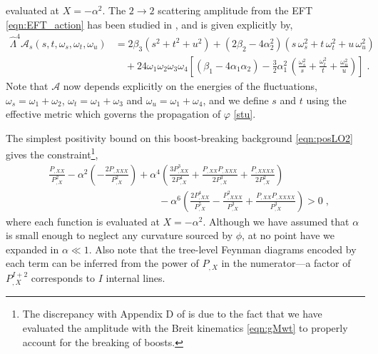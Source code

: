 \documentclass[11pt]{article}
\begin{document}
evaluated at $X=-\alpha^2$. 
The $2 \to 2$ scattering amplitude from the EFT \eqref{eqn:EFT_action} has been studied in \cite{Baumann:2015nta, Grall:2021xxm}, and is given explicitly by, 
\begin{align}
\hat{\Lambda}^4\mathcal{A}_s (s,t, \omega_s, \omega_t, \omega_u) &= 
2 \beta_3(s^2+t^2+u^2)  
+ (2 \beta_2-4 \alpha_2^2) (s\,\omega_s^2 + t\, \omega_t^2 +u\, \omega_u^2) \nonumber \\
&\quad+ 24 \omega_1 \omega_2 \omega_3 \omega_4  \left[   \left( \beta_1- 4 \alpha_1 \alpha_2  \right) 
-  \frac{3}{2} \alpha_1^2  \,   \left(\frac{\omega_s^2}{s}+\frac{\omega_t^2}{t}+\frac{\omega_u^2}{u}\right) \right] \; .   \nonumber 
\end{align}
Note that $\mathcal{A}$ now depends explicitly on the energies of the fluctuations, $\omega_s = \omega_1 + \omega_2$, $\omega_t = \omega_1 + \omega_3$ and $\omega_u = \omega_1 + \omega_4$, and we define $s$ and $t$ using the effective metric which governs the propagation of $\varphi$ \eqref{stu}.

The simplest positivity bound on this boost-breaking background \eqref{eqn:posLO2} gives the constraint\footnote{
The discrepancy with Appendix D of \cite{Ye:2019oxx} is due to the fact that we have evaluated the amplitude with the Breit kinematics \eqref{eqn:gMwt} to properly account for the breaking of boosts. 
},
\begin{align}
&\frac{P_{,XX} }{ P_{,X}^2 } - \alpha^2 \left( - \frac{ 2 P_{,XXX} }{ P_{,X}^2 } \right) + \alpha^4 
\left( 
 \frac{ 3 P_{,XX}^3 }{ 2 P_{,X}^4 } +  \frac{ P_{,XX} P_{,XXX} }{ 2 P_{,X}^3 } +  \frac{ P_{,XXXX} }{ 2 P_{,X}^2 }  \right)  \nonumber  \\
&\qquad\qquad\qquad\qquad\qquad\quad- \alpha^6 \left(
 \frac{2 P_{,XX}^4 }{ P_{,X}^5 } - \frac{ P_{,XXX}^2 }{ P_{,X}^3 } + \frac{  P_{,XX} P_{,XXXX} }{ P_{,X}^3 }  \right) > 0 \; , 
 \label{eqn:pos_PX}
\end{align}
where each function is evaluated at $X = - \alpha^2$. Although we have assumed that $\alpha$ is small enough to neglect any curvature sourced by $\phi$, at no point have we expanded in $\alpha \ll 1$. Also note that the tree-level Feynman diagrams encoded by each term can be inferred from the power of $P_{,X}$ in the numerator---a factor of $P_{,X}^{I+2}$ corresponds to $I$ internal lines.
\end{document}
